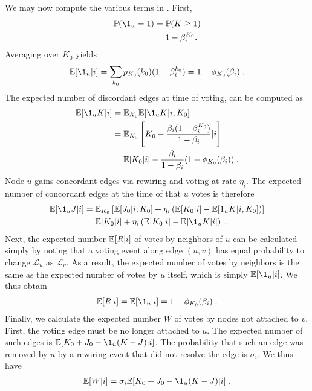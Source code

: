 \documentclass[final,supplement,onefignum,onetabnum]{siamart171218}
\begin{document}
  We may now compute the various terms in . First, 
  \begin{align*}
    \prob(\1_u = 1) &= \prob(K \geq 1) \\ 
             &= 1-\beta_i^{K_0}.
  \end{align*}
  Averaging over $K_0$ yields
  \begin{align*}
    \E[\1_u|i] = \sum_{k_0}p_{K_0}(k_0)(1-\beta_i^{k_0}) = 1 - \phi_{K_0}(\beta_i)\;.
  \end{align*}
  The expected number of discordant edges at time of voting, can be computed as 
  \begin{align*}
    \E[\1_uK|i] &= \E_{K_0}\E[\1_uK|i, K_0] \\ 
                &= \E_{K_0}\left[K_0 - \frac{\beta_i(1-\beta_i^{K_0})}{1-\beta_i}|i\right] \\ 
                &= \E[K_0|i] - \frac{\beta_i}{1-\beta_i}(1-\phi_{K_0}(\beta_i))\;.
  \end{align*}
  Node $u$ gains concordant edges via rewiring and voting at rate $\eta_i$. The expected number of concordant edges at the time of that $u$ votes is therefore 
  \begin{align*}
    \E[\1_uJ|i] &= \E_{K_0}\left[\E[J_0|i, K_0] + \eta_i \left(\E[K_0|i] - \E[1_uK|i, K_0]\right)\right] \\
                &= \E[K_0|i] + \eta_i \left(\E[K_0|i] - \E[\1_uK|i]\right)\;.
  \end{align*}
  Next, the expected number $\mathbb{E}[R|i]$ of votes by neighbors of $u$ can be calculated simply by noting that a voting event along edge $(u,v)$ has equal probability to change $\mathcal{L}_u$ as $\mathcal{L}_v$. 
  As a result, the expected number of votes by neighbors is the same as the expected number of votes by $u$ itself, which is simply $\E[\1_u|i]$. We thus obtain 
  \begin{align*}
    \E[R|i] = \E[\1_u|i] = 1 - \phi_{K_0}(\beta_i)\;. 
  \end{align*}
  Finally, we calculate the expected number $W$ of votes by nodes not attached to $v$. 
  First, the voting edge must be no longer attached to $u$. 
  The expected number of such edges is $\E[K_0 + J_0 - \1_u(K - J)|i]$. 
  The probability that such an edge was removed by $u$ by a rewiring event that did not resolve the edge is $\sigma_i$. 
  We thus have 
  \begin{align*}
    \E[W|i] = \sigma_i\E[K_0 + J_0 - \1_u(K - J)|i]\;.
  \end{align*}
\end{document}
